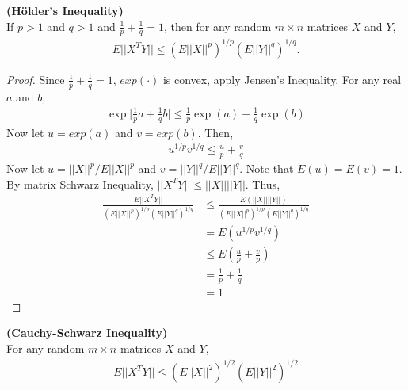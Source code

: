 \documentclass[11pt]{article} %
\theoremstyle{definition}
\numberwithin{defn}{subsection}
\numberwithin{thm}{subsection}
\numberwithin{ex}{subsection}
\newcommand{\bb}[1]{\mathbb{#1}}
\newcommand{\R}{\bb{R}}
\begin{document}
\begin{thm}\label{thm:holdersineq}
	\textbf{(H\"{o}lder's Inequality)}\\
	If $p>1$ and $q>1$ and $\frac{1}{p}+\frac{1}{q}=1$, then for any random $m\times n$ matrices $X$ and $Y$,
	\begin{align*}
	E||X^TY||\le(E||X||^p)^{1/p}(E||Y||^q)^{1/q}.
	\end{align*}
	\begin{proof}
		Since $\frac{1}{p}+\frac{1}{q}=1$, $exp(\cdot)$ is convex, apply Jensen's Inequality. For any real $a$ and $b$,
		\begin{align*}
		\exp\Big[\frac{1}{p}a+\frac{1}{q}b\Big]\le\frac{1}{p}\exp(a)+\frac{1}{q}\exp(b)
		\end{align*}
		Now let $u=exp(a)$ and $v=exp(b)$. Then,
		\begin{align*}
		u^{1/p}v^{1/q}\le\frac{u}{p}+\frac{v}{q}
		\end{align*}
		Now let $u=||X||^p/E||X||^p$ and $v=||Y||^q/E||Y||^q$. Note that $E(u)=E(v)=1$. By matrix Schwarz Inequality, $||X^TY||\le||X||||Y||$. Thus,
		\begin{align*}
		\frac{E||X^TY||}{(E||X||^p)^{1/p}(E||Y||^q)^{1/q}}&\le\frac{E(||X||||Y||)}{(E||X||^p)^{1/p}(E||Y||^q)^{1/q}}\\
		&=E(u^{1/p}v^{1/q})\\
		&\le E(\frac{u}{p}+\frac{v}{p})\\
		&=\frac{1}{p}+\frac{1}{q}\\
		&=1
		\end{align*}
	\end{proof}
\end{thm}

\begin{thm}\label{thm:CSineq}
	\textbf{(Cauchy-Schwarz Inequality)}\\
	For any random $m\times n$ matrices $X$ and $Y$,
	\begin{align*}
	E||X^TY||\le (E||X||^2)^{1/2}(E||Y||^2)^{1/2}
	\end{align*}
\end{thm}

\end{document}
